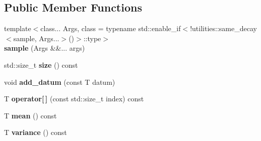 \subsection*{Public Member Functions}
\begin{DoxyCompactItemize}
\item 
\mbox{\label{classsequoia_1_1maths_1_1statistics_1_1sample_3_01_t_00_010_01_4_a8cb14608dc052d346cb2c6fad1ae6477}} 
{\footnotesize template$<$class... Args, class  = typename std\+::enable\+\_\+if$<$!utilities\+::same\+\_\+decay$<$sample, Args...$>$()$>$\+::type$>$ }\\{\bfseries sample} (Args \&\&... args)
\item 
\mbox{\label{classsequoia_1_1maths_1_1statistics_1_1sample_3_01_t_00_010_01_4_ada898bb530c6e56ac564f7c544bd7afc}} 
std\+::size\+\_\+t {\bfseries size} () const
\item 
\mbox{\label{classsequoia_1_1maths_1_1statistics_1_1sample_3_01_t_00_010_01_4_a5d51820be00363c07f41c565ca0bd1f8}} 
void {\bfseries add\+\_\+datum} (const T datum)
\item 
\mbox{\label{classsequoia_1_1maths_1_1statistics_1_1sample_3_01_t_00_010_01_4_ae02af8133850ed3da09982eb52cf10b6}} 
T {\bfseries operator\mbox{[}$\,$\mbox{]}} (const std\+::size\+\_\+t index) const
\item 
\mbox{\label{classsequoia_1_1maths_1_1statistics_1_1sample_3_01_t_00_010_01_4_ab515f5747e5603c492f5ac9dae4800cd}} 
T {\bfseries mean} () const
\item 
\mbox{\label{classsequoia_1_1maths_1_1statistics_1_1sample_3_01_t_00_010_01_4_a6e955fb39890d18dad2f05ddd0c2260d}} 
T {\bfseries variance} () const
\item 
\mbox{\label{classsequoia_1_1maths_1_1statistics_1_1sample_3_01_t_00_010_01_4_ac0318f38cf71dbc7f28d5dab4d601ac4}} 

\end{DoxyCompactItemize}
